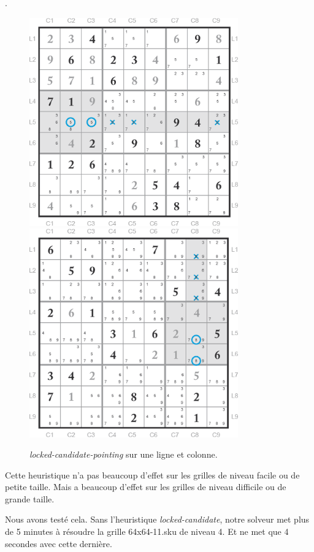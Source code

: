 \documentclass{article}
\begin{document}
\begin{enumerate}
    \vspace{0.12cm}.
    \begin{figure}[H]
    \includegraphics[width=9cm,left]{locked-candidate-row.png}
    \includegraphics[width=9cm,right]{reduction3.png}
    \caption{\textit{locked-candidate-pointing} sur une ligne et colonne\cite{locked_candidates_rules}.}
\end{figure}

Cette heuristique n'a pas beaucoup d'effet sur les grilles de niveau facile ou de petite taille. Mais a beaucoup d'effet sur les grilles de niveau difficile ou de grande taille. \vspace{0.2cm}

Nous avons testé cela. Sans l'heuristique \textit{locked-candidate}, notre solveur met plus de 5 minutes à résoudre la grille 64x64-11.sku
 de niveau 4. Et ne met que 4 secondes avec cette dernière.\vspace{0.5cm}


\end{enumerate}
\end{document}

